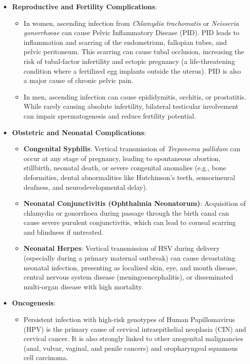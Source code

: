 \begin{itemize}
    \item \textbf{Reproductive and Fertility Complications}:
    \begin{itemize}
        \item In women, ascending infection from \textit{Chlamydia trachomatis} or \textit{Neisseria gonorrhoeae} can cause Pelvic Inflammatory Disease (PID). PID leads to inflammation and scarring of the endometrium, fallopian tubes, and pelvic peritoneum. This scarring can cause tubal occlusion, increasing the risk of tubal-factor infertility and ectopic pregnancy (a life-threatening condition where a fertilized egg implants outside the uterus). PID is also a major cause of chronic pelvic pain.
        \item In men, ascending infection can cause epididymitis, orchitis, or prostatitis. While rarely causing absolute infertility, bilateral testicular involvement can impair spermatogenesis and reduce fertility potential.
    \end{itemize}
    \item \textbf{Obstetric and Neonatal Complications}:
    \begin{itemize}
        \item \textbf{Congenital Syphilis}: Vertical transmission of \textit{Treponema pallidum} can occur at any stage of pregnancy, leading to spontaneous abortion, stillbirth, neonatal death, or severe congenital anomalies (e.g., bone deformities, dental abnormalities like Hutchinson's teeth, sensorineural deafness, and neurodevelopmental delay).
        \item \textbf{Neonatal Conjunctivitis (Ophthalmia Neonatorum)}: Acquisition of chlamydia or gonorrhoea during passage through the birth canal can cause severe purulent conjunctivitis, which can lead to corneal scarring and blindness if untreated.
        \item \textbf{Neonatal Herpes}: Vertical transmission of HSV during delivery (especially during a primary maternal outbreak) can cause devastating neonatal infection, presenting as localized skin, eye, and mouth disease, central nervous system disease (meningoencephalitis), or disseminated multi-organ disease with high mortality.
    \end{itemize}
    \item \textbf{Oncogenesis}:
    \begin{itemize}
        \item Persistent infection with high-risk genotypes of Human Papillomavirus (HPV) is the primary cause of cervical intraepithelial neoplasia (CIN) and cervical cancer. It is also strongly linked to other anogenital malignancies (anal, vulvar, vaginal, and penile cancers) and oropharyngeal squamous cell carcinoma.

\end{itemize}
\end{itemize}
